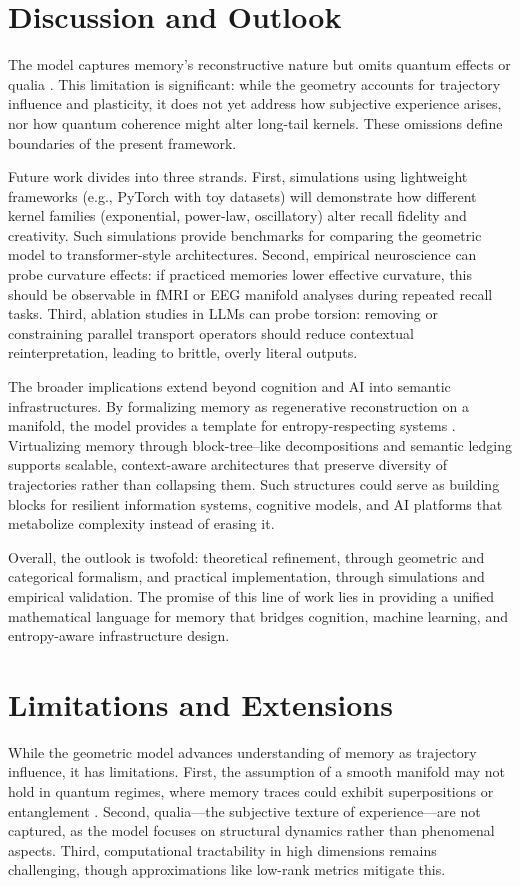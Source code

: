 \documentclass[a4paper,12pt]{article}
\begin{document}
\section{Discussion and Outlook}
The model captures memory’s reconstructive nature but omits quantum effects or qualia 
\citep{penrose1989road}. This limitation is significant: while the geometry accounts for 
trajectory influence and plasticity, it does not yet address how subjective experience 
arises, nor how quantum coherence might alter long-tail kernels. These omissions define 
boundaries of the present framework.

Future work divides into three strands. First, simulations using lightweight frameworks 
(e.g., PyTorch with toy datasets) will demonstrate how different kernel families 
(exponential, power-law, oscillatory) alter recall fidelity and creativity. Such 
simulations provide benchmarks for comparing the geometric model to transformer-style 
architectures. Second, empirical neuroscience can probe curvature effects: if practiced 
memories lower effective curvature, this should be observable in fMRI or EEG manifold 
analyses during repeated recall tasks. Third, ablation studies in LLMs can probe torsion: 
removing or constraining parallel transport operators should reduce contextual 
reinterpretation, leading to brittle, overly literal outputs.

The broader implications extend beyond cognition and AI into semantic infrastructures. 
By formalizing memory as regenerative reconstruction on a manifold, the model provides a 
template for entropy-respecting systems \citep{semantic2025}. Virtualizing memory through 
block-tree–like decompositions and semantic ledging supports scalable, context-aware 
architectures that preserve diversity of trajectories rather than collapsing them. Such 
structures could serve as building blocks for resilient information systems, cognitive 
models, and AI platforms that metabolize complexity instead of erasing it.

Overall, the outlook is twofold: theoretical refinement, through geometric and categorical 
formalism, and practical implementation, through simulations and empirical validation. 
The promise of this line of work lies in providing a unified mathematical language for 
memory that bridges cognition, machine learning, and entropy-aware infrastructure design.

\section{Limitations and Extensions}
While the geometric model advances understanding of memory as trajectory influence, it 
has limitations. First, the assumption of a smooth manifold may not hold in quantum regimes, 
where memory traces could exhibit superpositions or entanglement \citep{penrose1989road}. 
Second, qualia—the subjective texture of experience—are not captured, as the model focuses 
on structural dynamics rather than phenomenal aspects. Third, computational tractability 
in high dimensions remains challenging, though approximations like low-rank metrics 
mitigate this.
\end{document}
